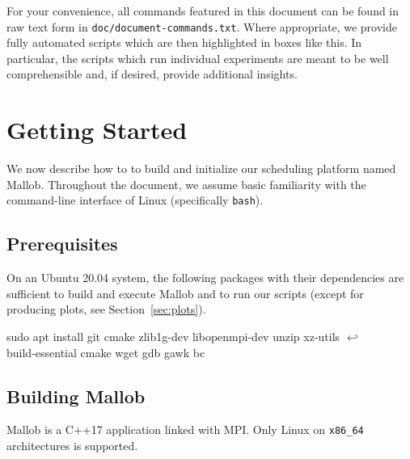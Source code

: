 \documentclass[runningheads]{article}
\newcommand{\CR}{{\tiny$\hookleftarrow$}}
\numberwithin{dummy}{subsection}
\begin{document}
\begin{tcolorbox}[
  colback=Magenta!5!white,
  colframe=Magenta!75!black,
  title={\centering Commands and Scripts}]
For your convenience, all commands featured in this document can be found in raw text form in \texttt{doc/document-commands.txt}.
Where appropriate, we provide fully automated scripts which are then highlighted in boxes like this.
In particular, the scripts which run individual experiments are meant to be well comprehensible and, if desired, provide additional insights.
\end{tcolorbox}





\section{Getting Started}

We now describe how to to build and initialize our scheduling platform named Mallob.
Throughout the document, we assume basic familiarity with the command-line interface of Linux (specifically \texttt{bash}).

\subsection{Prerequisites}
\label{sec:prerequisites}

On an Ubuntu 20.04 system, the following packages with their dependencies are sufficient to build and execute Mallob and to run our scripts (except for producing plots, see Section~\ref{sec:plots}).

\begin{ttfenv}
sudo apt install git cmake zlib1g-dev libopenmpi-dev unzip xz-utils \CR\\
\hspace*{0.3cm}build-essential cmake wget gdb gawk bc
\end{ttfenv}






\subsection{Building Mallob}

Mallob is a C++17 application linked with MPI. Only Linux on \texttt{x86\_64} architectures is supported.
\end{document}
